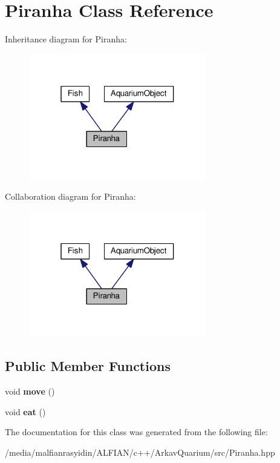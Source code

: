 \hypertarget{class_piranha}{}\section{Piranha Class Reference}
\label{class_piranha}


Inheritance diagram for Piranha\+:
\nopagebreak
\begin{figure}[H]
\begin{center}
\leavevmode
\includegraphics[width=220pt]{class_piranha__inherit__graph}
\end{center}
\end{figure}


Collaboration diagram for Piranha\+:
\nopagebreak
\begin{figure}[H]
\begin{center}
\leavevmode
\includegraphics[width=220pt]{class_piranha__coll__graph}
\end{center}
\end{figure}
\subsection*{Public Member Functions}
\begin{DoxyCompactItemize}
\item 
\mbox{\label{class_piranha_a6b86e73b3e5a57ee0fdb768c24ab9b67}} 
void {\bfseries move} ()
\item 
\mbox{\label{class_piranha_ac48c0256edd56c427b3d82f6e0d4df82}} 
void {\bfseries eat} ()
\end{DoxyCompactItemize}


The documentation for this class was generated from the following file\+:\begin{DoxyCompactItemize}
\item 
/media/malfianrasyidin/\+A\+L\+F\+I\+A\+N/c++/\+Arkav\+Quarium/src/Piranha.\+hpp\end{DoxyCompactItemize}
